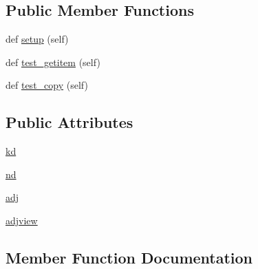 \subsection*{Public Member Functions}
\begin{DoxyCompactItemize}
\item 
def \hyperlink{classnetworkx_1_1classes_1_1tests_1_1test__coreviews_1_1TestMultiAdjacencyView_ab15f75db4a093237ad775c1c315a73a8}{setup} (self)
\item 
def \hyperlink{classnetworkx_1_1classes_1_1tests_1_1test__coreviews_1_1TestMultiAdjacencyView_a21cda965b7c94d43df3f70399fae609c}{test\+\_\+getitem} (self)
\item 
def \hyperlink{classnetworkx_1_1classes_1_1tests_1_1test__coreviews_1_1TestMultiAdjacencyView_a41f13e6148996e21b42b8760e0dcfed3}{test\+\_\+copy} (self)
\end{DoxyCompactItemize}
\subsection*{Public Attributes}
\begin{DoxyCompactItemize}
\item 
\hyperlink{classnetworkx_1_1classes_1_1tests_1_1test__coreviews_1_1TestMultiAdjacencyView_a187370ccec3b442c85f8d71dcb9b395f}{kd}
\item 
\hyperlink{classnetworkx_1_1classes_1_1tests_1_1test__coreviews_1_1TestMultiAdjacencyView_a486c6bac32999e9b66327b01b0e26914}{nd}
\item 
\hyperlink{classnetworkx_1_1classes_1_1tests_1_1test__coreviews_1_1TestMultiAdjacencyView_a2864240be7b36c648601a0c623e0cf1d}{adj}
\item 
\hyperlink{classnetworkx_1_1classes_1_1tests_1_1test__coreviews_1_1TestMultiAdjacencyView_a5c7b7eb95049f44a00a9c4efa8c4571f}{adjview}
\end{DoxyCompactItemize}


\subsection{Member Function Documentation}
\mbox{\label{classnetworkx_1_1classes_1_1tests_1_1test__coreviews_1_1TestMultiAdjacencyView_ab15f75db4a093237ad775c1c315a73a8}} 
